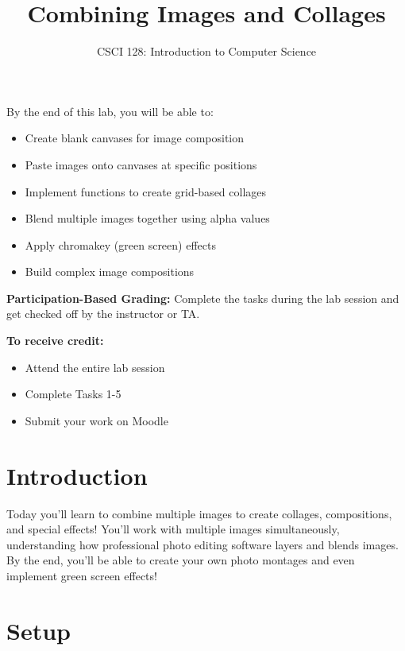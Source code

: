 \documentclass[11pt]{article}
\title{Combining Images and Collages}
\author{CSCI 128: Introduction to Computer Science}
\begin{document}
\maketitle

\begin{objectives}
By the end of this lab, you will be able to:
\begin{itemize}
    \item Create blank canvases for image composition
    \item Paste images onto canvases at specific positions
    \item Implement functions to create grid-based collages
    \item Blend multiple images together using alpha values
    \item Apply chromakey (green screen) effects
    \item Build complex image compositions
\end{itemize}
\end{objectives}

\begin{grading}
\textbf{Participation-Based Grading:} Complete the tasks during the lab session and get checked off by the instructor or TA.

\vspace{0.5em}

\textbf{To receive credit:}
\begin{itemize}
    \item Attend the entire lab session
    \item Complete Tasks 1-5
    \item Submit your work on Moodle
\end{itemize}
\end{grading}

\section{Introduction}

Today you'll learn to combine multiple images to create collages, compositions, and special effects! You'll work with multiple images simultaneously, understanding how professional photo editing software layers and blends images. By the end, you'll be able to create your own photo montages and even implement green screen effects!

\section{Setup}
\end{document}
